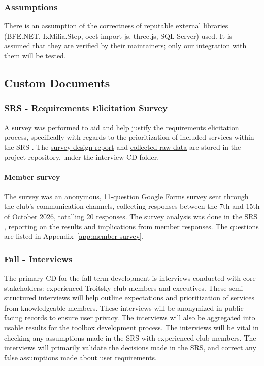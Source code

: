 \documentclass[12pt, titlepage]{article}
\begin{document}
\subsubsection{Assumptions}
There is an assumption of the correctness of reputable external libraries (BFE.NET, IxMilia.Step, occt-import-js, three.js,
SQL Server) used. It is assumed that they are verified by their maintainers; only our
integration with them will be tested.

\subsection{Custom Documents}

\subsubsection{SRS - Requirements Elicitation Survey}

A survey was performed to aid and help justify the requirements elicitation process, specifically with regards to the prioritization of included services within the SRS \citep{TroitskySRS}.
The \href{https://github.com/JackEaston4/Troitsky-Toolbox/blob/main/docs/CDs/Interviews/RequirementElicitationSurvey/SurveyDesign.md}{survey design report} and 
\href{https://github.com/JackEaston4/Troitsky-Toolbox/blob/main/docs/CDs/Interviews/RequirementElicitationSurvey/Troitsky%20Toolbox%20%E2%80%94%20Member%20Needs%20%26%20Service%20Priority%20Survey.csv}{collected raw data} 
are stored in the project repository, under the interview CD folder.

\paragraph{Member survey} The survey was an anonymous, 11-question Google Forms survey sent through the club's communication channels, collecting responses 
between the 7th and 15th of October 2026, totalling 20 responses. The survey analysis was done in the SRS \citep{TroitskySRS}, reporting on the results and implications from member responses. 
The questions are listed in Appendix~\ref{app:member-survey}.

\subsubsection{Fall - Interviews}

The primary CD for the fall term development is interviews conducted with core stakeholders: experienced Troitsky club members and executives. These semi-structured interviews will 
help outline expectations and prioritization of services from knowledgeable members. These interviews will be anonymized in public-facing records to ensure user privacy. The interviews will also be aggregated into usable results for the 
toolbox development process. The interviews will be vital in checking any assumptions made in the SRS with experienced club 
members. The interviews will primarily validate the decisions made in the SRS, and correct any false assumptions made about
 user requirements. 
\end{document}
